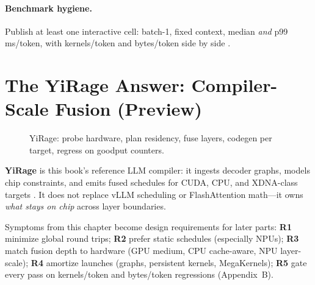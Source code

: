 \paragraph{Benchmark hygiene.}
Publish at least one interactive cell: batch-1, fixed context, median \emph{and} p99 ms/token, with kernels/token and bytes/token side by side \citep{memoryfloor2026,chen2026towardshighgoodput}.

\section{The YiRage Answer: Compiler-Scale Fusion (Preview)}
\label{sec:yirage_preview}
\begin{figure}[t]
\centering
{}
\caption{YiRage: probe hardware, plan residency, fuse layers, codegen per target, regress on goodput counters.}
\label{fig:yirage_pipeline}
\end{figure}

\textbf{YiRage} is this book's reference  LLM compiler: it ingests decoder graphs, models chip constraints, and emits fused schedules for CUDA, CPU, and XDNA-class targets \citep{yirage2026}.
It does not replace vLLM scheduling or FlashAttention math---it owns \emph{what stays on chip} across layer boundaries.

Symptoms from this chapter become design requirements for later parts:
\textbf{R1} minimize global round trips;
\textbf{R2} prefer static schedules (especially NPUs);
\textbf{R3} match fusion depth to hardware (GPU medium, CPU cache-aware, NPU layer-scale);
\textbf{R4} amortize launches (graphs, persistent kernels, MegaKernels);
\textbf{R5} gate every pass on kernels/token and bytes/token regressions (Appendix~B).


